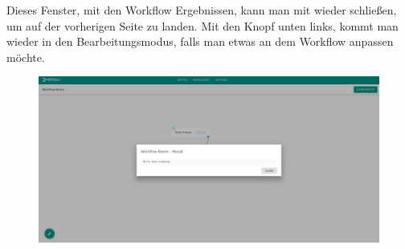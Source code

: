     \noindent Dieses Fenster, mit den Workflow Ergebnissen, kann man mit wieder schließen, um auf der vorherigen Seite zu landen. Mit den Knopf unten links, kommt man wieder in den Bearbeitungsmodus, falls man etwas an dem Workflow anpassen möchte. 
    \begin{figure}[H]
        \centering
        \includegraphics[width=15.5cm]{images/Workflow Result.png}
        \label{workflow_result}
    \end{figure}
    
